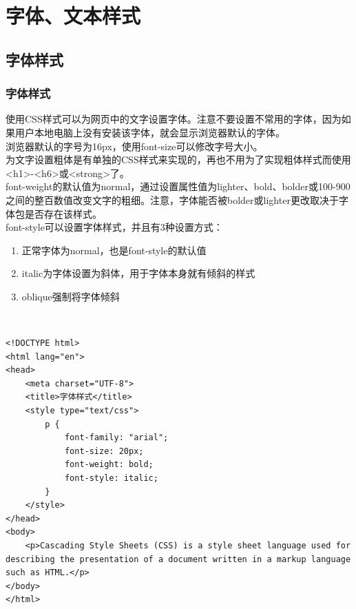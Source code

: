 \newpage

\chapter{字体、文本样式}

\section{字体样式}

\subsection{字体样式}

使用CSS样式可以为网页中的文字设置字体。注意不要设置不常用的字体，因为如果用户本地电脑上没有安装该字体，就会显示浏览器默认的字体。 \\

浏览器默认的字号为16px，使用font-size可以修改字号大小。 \\

为文字设置粗体是有单独的CSS样式来实现的，再也不用为了实现粗体样式而使用<h1>-<h6>或<strong>了。 \\

font-weight的默认值为normal，通过设置属性值为lighter、bold、bolder或100-900之间的整百数值改变文字的粗细。注意，字体能否被bolder或lighter更改取决于字体包是否存在该样式。 \\

font-style可以设置字体样式，并且有3种设置方式：

\begin{enumerate}
	\item 正常字体为normal，也是font-style的默认值
	\item italic为字体设置为斜体，用于字体本身就有倾斜的样式
	\item oblique强制将字体倾斜
\end{enumerate}

 \\

\begin{lstlisting}[style=htmlcssjs]
<!DOCTYPE html>
<html lang="en">
<head>
    <meta charset="UTF-8">
    <title>字体样式</title>
    <style type="text/css">
        p {
            font-family: "arial";
            font-size: 20px;
            font-weight: bold;
            font-style: italic;
        }   
    </style>
</head>
<body>
    <p>Cascading Style Sheets (CSS) is a style sheet language used for describing the presentation of a document written in a markup language such as HTML.</p>
</body>
</html>
\end{lstlisting}

